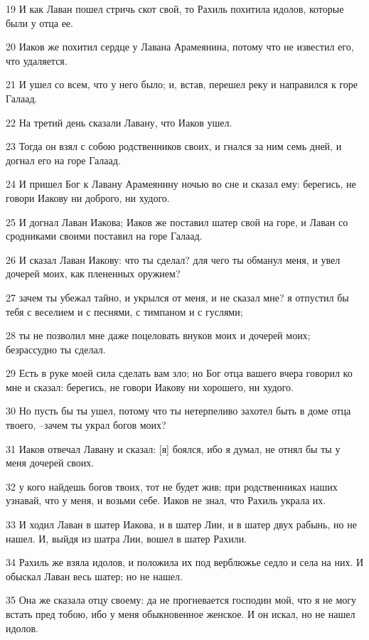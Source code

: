 \par 19 И как Лаван пошел стричь скот свой, то Рахиль похитила идолов, которые были у отца ее.
\par 20 Иаков же похитил сердце у Лавана Арамеянина, потому что не известил его, что удаляется.
\par 21 И ушел со всем, что у него было; и, встав, перешел реку и направился к горе Галаад.
\par 22 На третий день сказали Лавану, что Иаков ушел.
\par 23 Тогда он взял с собою родственников своих, и гнался за ним семь дней, и догнал его на горе Галаад.
\par 24 И пришел Бог к Лавану Арамеянину ночью во сне и сказал ему: берегись, не говори Иакову ни доброго, ни худого.
\par 25 И догнал Лаван Иакова; Иаков же поставил шатер свой на горе, и Лаван со сродниками своими поставил на горе Галаад.
\par 26 И сказал Лаван Иакову: что ты сделал? для чего ты обманул меня, и увел дочерей моих, как плененных оружием?
\par 27 зачем ты убежал тайно, и укрылся от меня, и не сказал мне? я отпустил бы тебя с веселием и с песнями, с тимпаном и с гуслями;
\par 28 ты не позволил мне даже поцеловать внуков моих и дочерей моих; безрассудно ты сделал.
\par 29 Есть в руке моей сила сделать вам зло; но Бог отца вашего вчера говорил ко мне и сказал: берегись, не говори Иакову ни хорошего, ни худого.
\par 30 Но пусть бы ты ушел, потому что ты нетерпеливо захотел быть в доме отца твоего, --зачем ты украл богов моих?
\par 31 Иаков отвечал Лавану и сказал: [я] боялся, ибо я думал, не отнял бы ты у меня дочерей своих.
\par 32 у кого найдешь богов твоих, тот не будет жив; при родственниках наших узнавай, что у меня, и возьми себе. Иаков не знал, что Рахиль украла их.
\par 33 И ходил Лаван в шатер Иакова, и в шатер Лии, и в шатер двух рабынь, но не нашел. И, выйдя из шатра Лии, вошел в шатер Рахили.
\par 34 Рахиль же взяла идолов, и положила их под верблюжье седло и села на них. И обыскал Лаван весь шатер; но не нашел.
\par 35 Она же сказала отцу своему: да не прогневается господин мой, что я не могу встать пред тобою, ибо у меня обыкновенное женское. И он искал, но не нашел идолов.
